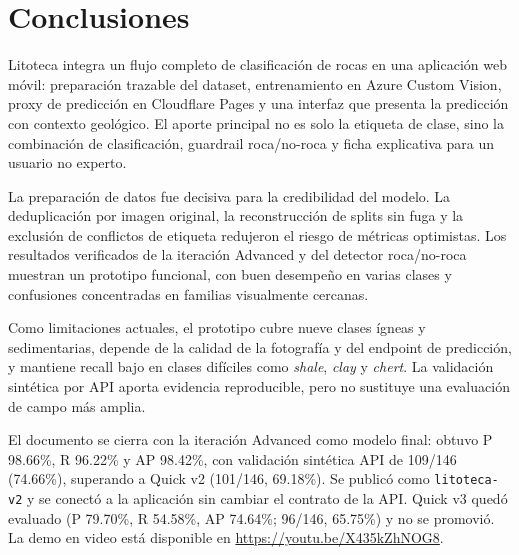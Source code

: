 \section{Conclusiones}
\label{sec:conclusions}

Litoteca integra un flujo completo de clasificación de rocas en una aplicación web
móvil: preparación trazable del dataset, entrenamiento en Azure Custom Vision, proxy
de predicción en Cloudflare Pages y una interfaz que presenta la predicción con
contexto geológico. El aporte principal no es solo la etiqueta de clase, sino la
combinación de clasificación, guardrail roca/no-roca y ficha explicativa para un
usuario no experto.

La preparación de datos fue decisiva para la credibilidad del modelo. La
deduplicación por imagen original, la reconstrucción de splits sin fuga y la
exclusión de conflictos de etiqueta redujeron el riesgo de métricas optimistas. Los
resultados verificados de la iteración Advanced y del detector roca/no-roca muestran un prototipo
funcional, con buen desempeño en varias clases y confusiones concentradas en
familias visualmente cercanas.

Como limitaciones actuales, el prototipo cubre nueve clases ígneas y sedimentarias,
depende de la calidad de la fotografía y del endpoint de predicción, y mantiene
recall bajo en clases difíciles como \emph{shale}, \emph{clay} y \emph{chert}. La
validación sintética por API aporta evidencia reproducible, pero no sustituye una
evaluación de campo más amplia.

El documento se cierra con la iteración Advanced como modelo final: obtuvo P
98.66\%, R 96.22\% y AP 98.42\%, con validación sintética API de 109/146 (74.66\%),
superando a Quick v2 (101/146, 69.18\%). Se publicó como \texttt{litoteca-v2} y se
conectó a la aplicación sin cambiar el contrato de la API. Quick v3 quedó evaluado
(P 79.70\%, R 54.58\%, AP 74.64\%; 96/146, 65.75\%) y no se promovió. La demo en
video está disponible en \url{https://youtu.be/X435kZhNOG8}.
